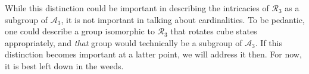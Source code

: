 \documentclass[10pt,letterpaper]{report}
\begin{document}
While this distinction could be important in describing the intricacies of $\mathcal{R}_3$ as a subgroup of $\mathcal{A}_3$, it is not important in talking about cardinalities.  To be pedantic, one could describe a group isomorphic to $\mathcal{R}_3$ that rotates cube states appropriately, and \textit{that} group would technically be a subgroup of $\mathcal{A}_3$.  If this distinction becomes important at a latter point, we will address it then.  For now, it is best left down in the weeds.
\end{document}
